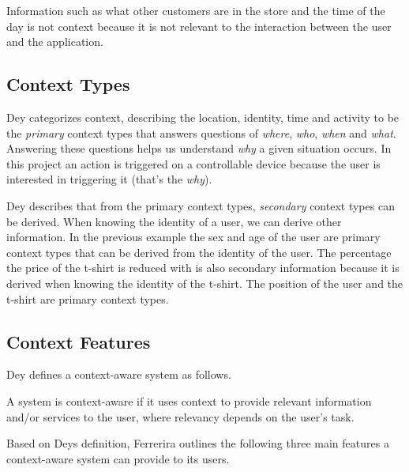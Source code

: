 Information such as what other customers are in the store and the time of the day is not context because it is not relevant to the interaction between the user and the application.

\subsection{Context Types}

Dey \cite{abowd1999towards} categorizes context, describing the location, identity, time and activity to be the \emph{primary} context types that answers questions of \emph{where}, \emph{who}, \emph{when} and \emph{what}. Answering these questions helps us understand \emph{why} a given situation occurs. In this project an action is triggered on a controllable device because the user is interested in triggering it (that's the \emph{why}).

Dey describes that from the primary context types, \emph{secondary} context types can be derived. When knowing the identity of a user, we can derive other information. In the previous example the sex and age of the user are primary context types that can be derived from the identity of the user. The percentage the price of the t-shirt is reduced with is also secondary information because it is derived when knowing the identity of the t-shirt. The position of the user and the t-shirt are primary context types.

\subsection{Context Features}

Dey \cite{abowd1999towards} defines a context-aware system as follows.

\begin{italicquote}
A system is context-aware if it uses context to provide relevant information and/or services to the user, where relevancy depends on the user's task.
\end{italicquote}

Based on Deys definition, Ferrerira \cite{ferreira2014distributed} outlines the following three main features a context-aware system can provide to its users.

